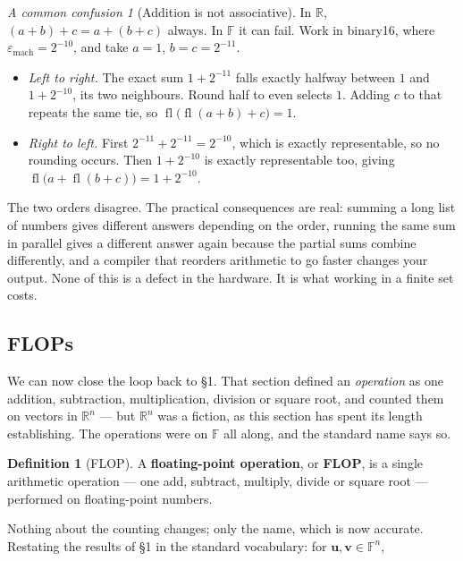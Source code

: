 \documentclass[11pt]{article}
\theoremstyle{plain}
\theoremstyle{definition}
\newtheorem{defn}{Definition}[section]
\theoremstyle{remark}
\newtheorem*{warn}{A common confusion}
\newcommand{\R}{\mathbb{R}}
\newcommand{\F}{\mathbb{F}}
\newcommand{\vc}[1]{\mathbf{#1}}
\newcommand{\epsm}{\varepsilon_{\mathrm{mach}}}
\begin{document}
\begin{warn}[Addition is not associative]
In $\R$, $(a+b)+c=a+(b+c)$ always. In $\F$ it can fail. Work in binary16, where
$\epsm=2^{-10}$, and take $a=1$, $b=c=2^{-11}$.
\begin{itemize}[leftmargin=1.4em,itemsep=3pt,topsep=3pt]
  \item \emph{Left to right.} The exact sum $1+2^{-11}$ falls exactly halfway
        between $1$ and $1+2^{-10}$, its two neighbours. Round half to even
        selects $1$. Adding $c$ to that repeats the same tie, so
        $\operatorname{fl}\bigl(\operatorname{fl}(a+b)+c\bigr) = 1$.
  \item \emph{Right to left.} First $2^{-11}+2^{-11}=2^{-10}$, which is exactly
        representable, so no rounding occurs. Then $1+2^{-10}$ is exactly
        representable too, giving
        $\operatorname{fl}\bigl(a+\operatorname{fl}(b+c)\bigr) = 1+2^{-10}$.
\end{itemize}
The two orders disagree. The practical consequences are real: summing a long
list of numbers gives different answers depending on the order, running the same
sum in parallel gives a different answer again because the partial sums combine
differently, and a compiler that reorders arithmetic to go faster changes your
output. None of this is a defect in the hardware. It is what working in a finite
set costs.
\end{warn}

\subsection{FLOPs}
We can now close the loop back to \S1. That section defined an \emph{operation}
as one addition, subtraction, multiplication, division or square root, and
counted them on vectors in $\R^{n}$ --- but $\R^{n}$ was a fiction, as this
section has spent its length establishing. The operations were on $\F$ all
along, and the standard name says so.

\begin{defn}[FLOP]
A \textbf{floating-point operation}, or \textbf{FLOP}, is a single arithmetic
operation --- one add, subtract, multiply, divide or square root --- performed
on floating-point numbers.
\end{defn}

\noindent Nothing about the counting changes; only the name, which is now
accurate. Restating the results of \S1 in the standard vocabulary: for
$\vc{u},\vc{v}\in\F^{n}$,
\end{document}
